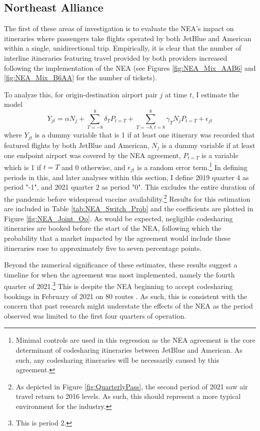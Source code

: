 \documentclass{article}
\begin{document}
	\subsection{Northeast Alliance}
	\label{sec:Analysis_NEA}

    
        
	The first of these areas of investigation is to evaluate the NEA's impact on itineraries where passengers take flights operated by both JetBlue and American within a single, unidirectional trip. Empirically, it is clear that the number of interline itineraries featuring travel provided by both providers increased following the implementation of the NEA (see Figures \ref{fig:NEA_Mix_AAB6} and \ref{fig:NEA_Mix_B6AA} for the number of tickets). 
	
	To analyze this, for origin-destination airport pair $j$ at time $t$,  I estimate the model \[Y_{jt} = \alpha N_{j} + \sum_{T = -8}^{8} \delta_{T} P_{t = T} + \sum_{T = -8, t = 8}^{8} \gamma_{T} N_{j} P_{t = T} + \epsilon_{jt}\] where $Y_{jt}$ is a dummy variable that is 1 if at least one itinerary was recorded that featured flights by both JetBlue and American,  $N_{j}$ is a dummy variable if at least one endpoint airport was covered by the NEA agreement, $P_{t = T}$ is a variable which is 1 if $t = T$ and 0 otherwise, and $\epsilon_{jt}$ is a random error term.\footnote{Minimal controls are used in this regression as the NEA agreement is the core determinant of codesharing itineraries between JetBlue and American. As such, any codesharing itineraries will be necessarily caused by this agreement.} In defining periods in this, and later analyses within this section, I define 2019 quarter 4 as period "-1", and 2021 quarter 2 as period "0". This excludes the entire duration of the pandemic before widespread vaccine availability.\footnote{As depicted in Figure \ref{fig:QuarterlyPass}, the second period of 2021 saw air travel return to 2016 levels. As such, this should represent a more typical environment for the industry.} Results for this estimation are included in Table \ref{tab:NEA_Switch_Prob} and the coefficients are plotted in Figure \ref{fig:NEA_Joint_Op}. As would be expected, negligible codesharing itineraries are booked before the start of the NEA, following which the probability that a market impacted by the agreement would include these itineraries rose to approximately five to seven percentage points. 
	
	Beyond the numerical significance of these estimates, these results suggest a timeline for when the agreement was most implemented, namely the fourth quarter of 2021.\footnote{This is period 2.} This is despite the NEA beginning to accept codesharing bookings in February of 2021 on 80 routes \citep{griff_8_2021}. As such, this is consistent with the concern that past research might understate the effects of the NEA as the period observed was limited to the first four quarters of operation.
	
\end{document}
